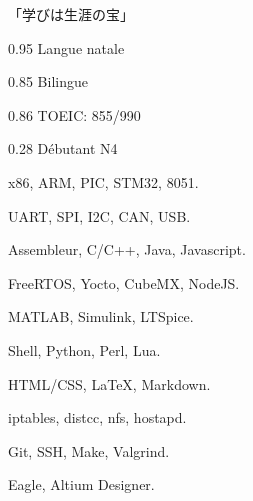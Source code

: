 \documentclass{faresume}
\begin{document}
\begin{column}[\rightcolumnwidth]


		\addcontent
		{
			{\Large\begin{CJK}{UTF8}{min}「学びは生涯の宝」\end{CJK}}
		}{}{}{}{}


		{}{}{}{}

		{}{}{}{}

		{}{}{}{}

		{}{}{}{}	


			{0.95}
			{Langue natale}
			{}{}{}

			{0.85}
			{Bilingue}
			{}{}{}

			{0.86}
			{TOEIC: 855/990}
			{}{}{}

			{0.28}
			{D\'ebutant N4}
			{}{}{}


			{x86, ARM, PIC, STM32, 8051.}
			{}{}{}{}

			{UART, SPI, I2C, CAN, USB.}
			{}{}{}{}

			{Assembleur, C/C++, Java, Javascript.}
			{}{}{}{}
        
			{FreeRTOS, Yocto, CubeMX, NodeJS.}
			{}{}{}{}

			{MATLAB, Simulink, LTSpice.}
			{}{}{}{}

			{Shell, Python, Perl, Lua.}
			{}{}{}{}

			{HTML/CSS, {\LaTeX}, Markdown.}
			{}{}{}{}

			{iptables, distcc, nfs, hostapd.}
			{}{}{}{}

			{Git, SSH, Make, Valgrind.}
			{}{}{}{}
		
			{Eagle, Altium Designer.}
			{}{}{}{}


\end{column}
\end{document}
